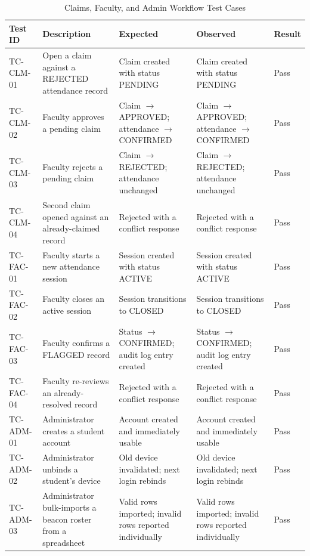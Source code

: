 \documentclass[12pt, a4paper, oneside]{report}
\begin{document}
\begin{table}[p]
\centering
\caption{Claims, Faculty, and Admin Workflow Test Cases}
\label{tab:claims-tests}
\tiny
\setlength{\tabcolsep}{3pt}
\renewcommand{\arraystretch}{1.03}
\begin{tabularx}{\textwidth}{|p{1.8cm}|X|X|X|p{0.9cm}|}
\hline
\textbf{Test ID} & \textbf{Description} & \textbf{Expected} & \textbf{Observed} & \textbf{Result} \\
\hline
TC-CLM-01 & Open a claim against a REJECTED attendance record & Claim created with status PENDING & Claim created with status PENDING & Pass \\
\hline
TC-CLM-02 & Faculty approves a pending claim & Claim $\rightarrow$ APPROVED; attendance $\rightarrow$ CONFIRMED & Claim $\rightarrow$ APPROVED; attendance $\rightarrow$ CONFIRMED & Pass \\
\hline
TC-CLM-03 & Faculty rejects a pending claim & Claim $\rightarrow$ REJECTED; attendance unchanged & Claim $\rightarrow$ REJECTED; attendance unchanged & Pass \\
\hline
TC-CLM-04 & Second claim opened against an already-claimed record & Rejected with a conflict response & Rejected with a conflict response & Pass \\
\hline
TC-FAC-01 & Faculty starts a new attendance session & Session created with status ACTIVE & Session created with status ACTIVE & Pass \\
\hline
TC-FAC-02 & Faculty closes an active session & Session transitions to CLOSED & Session transitions to CLOSED & Pass \\
\hline
TC-FAC-03 & Faculty confirms a FLAGGED record & Status $\rightarrow$ CONFIRMED; audit log entry created & Status $\rightarrow$ CONFIRMED; audit log entry created & Pass \\
\hline
TC-FAC-04 & Faculty re-reviews an already-resolved record & Rejected with a conflict response & Rejected with a conflict response & Pass \\
\hline
TC-ADM-01 & Administrator creates a student account & Account created and immediately usable & Account created and immediately usable & Pass \\
\hline
TC-ADM-02 & Administrator unbinds a student's device & Old device invalidated; next login rebinds & Old device invalidated; next login rebinds & Pass \\
\hline
TC-ADM-03 & Administrator bulk-imports a beacon roster from a spreadsheet & Valid rows imported; invalid rows reported individually & Valid rows imported; invalid rows reported individually & Pass \\
\hline
\end{tabularx}
\end{table}
\end{document}
